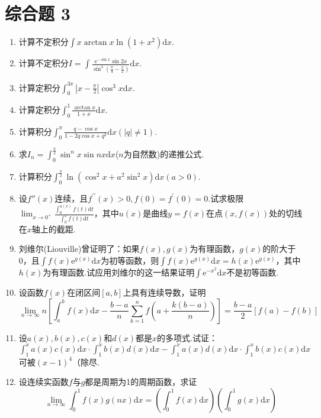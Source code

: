 \section{综合题 3}
\begin{enumerate}
	\item 计算不定积分$\int x \arctan x \ln \left(1+x^{2}\right) \mathrm{d} x$.
	\item 计算不定积分$I=\int \frac{\mathrm{e}^{-\sin x} \sin 2 x}{\sin ^{4}\left(\frac{\pi}{4}-\frac{x}{2}\right)} \mathrm{d} x$.
	\item 计算定积分$\int_{0}^{3 \pi}\left|x-\frac{\pi}{2}\right| \cos ^{3} x \mathrm{d} x$.
	\item 计算定积分$\int_{0}^{1} \frac{\arctan x}{1+x}\mathrm{d} x$.
	\item 计算积分$\int_{0}^{\pi} \frac{q-\cos x}{1-2 q \cos x+q^{2}} \mathrm{d} x(|q| \neq 1)$.
	
	\item 求$I_{n}=\int_{0}^{\frac{\pi}{2}} \sin ^{n} x \sin n x \mathrm{d} x$($n$为自然数)的递推公式.
	\item 计算积分$\int_{0}^{\frac{\pi}{2}} \ln \left(\cos ^{2} x+a^{2} \sin ^{2} x\right) \mathrm{d} x(a>0)$.
	\item 设$f''(x)$连续，且$f^{\prime \prime}(x)>0, f(0)=f^{\prime}(0)=0$.试求极限$\lim _{x \rightarrow 0^{+}} \frac{\int_{0}^{u(x)} f(t) \mathrm{d} t}{\int_{0}^{x} f(t) \mathrm{d} t}$，其中$u(x)$是曲线$y=f(x)$在点$(x,f(x))$处的切线在$x$轴上的截距.
	\item 刘维尔(Liouville)曾证明了：如果$f(x),g(x)$为有理函数，$g(x)$的阶大于0，且$\int f(x) \mathrm{e}^{g(x)} \mathrm{d} x$为初等函数，则$\int f(x) \mathrm{e}^{g(x)} \mathrm{d} x=h(x) \mathrm{e}^{g(x)}$，其中$h(x)$为有理函数.试应用刘维尔的这一结果证明$\int \mathrm{e}^{-x^{2}} \mathrm{d} x$不是初等函数.
	
	\item 设函数$f(x)$在闭区间$[a,b]$上具有连续导数，证明
	\[
	\lim _{n \rightarrow \infty} n\left[\int_{a}^{b} f(x) \mathrm{d} x-\frac{b-a}{n} \sum_{k=1}^{n} f\left(a+\frac{k(b-a)}{n}\right)\right]=\frac{b-a}{2}[f(a)-f(b)]
	\]
	
	\item 设$a(x),b(x),c(x)$和$d(x)$都是$x$的多项式.试证：$\int_{1}^{x} a(x) c(x) \mathrm{d} x \cdot \int_{1}^{x} b(x) d(x) \mathrm{d} x-\int_{1}^{x} a(x) d(x) \mathrm{d} x \cdot \int_{1}^{x} b(x) c(x) \mathrm{d} x$可被$(x-1)^{4}（$除尽.
	\item 设连续实函数$f$与$g$都是周期为1的周期函数，求证
	\[\lim _{n \rightarrow \infty} \int_{0}^{1} f(x) g(n x) \mathrm{d} x=\left(\int_{0}^{1} f(x) \mathrm{d} x\right)\left(\int_{0}^{1} g(x) \mathrm{d} x\right)\]
	

\end{enumerate}
